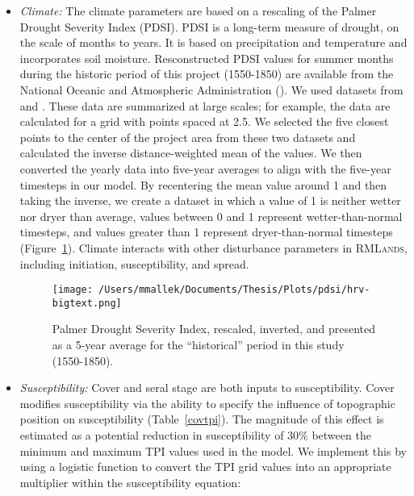 \begin{itemize}
\item \emph{Climate:} The climate parameters are based on a rescaling of the Palmer Drought Severity Index (PDSI). PDSI is a long-term measure of drought, on the scale of months to years. It is based on precipitation and temperature and incorporates soil moisture. Resconstructed PDSI values for summer months during the historic period of this project (1550-1850) are available from the National Oceanic and Atmospheric Administration (). We used datasets from \citet{Zhangetal.2004} and \citet{Cook2004}. These data are summarized at large scales; for example, the \citet{Cook2004} data are calculated for a grid with points spaced at 2.5\textdegree. We selected the five closest points to the center of the project area from these two datasets and calculated the inverse distance-weighted mean of the values. We then converted the yearly data into five-year averages to align with the five-year timesteps in our model. By recentering the mean value around 1 and then taking the inverse, we create a dataset in which a value of 1 is neither wetter nor dryer than average, values between 0 and 1 represent wetter-than-normal timesteps, and values greater than 1 represent dryer-than-normal timesteps (Figure~\ref{pdsi}). Climate interacts with other disturbance parameters in \textsc{RMLands}, including initiation, susceptibility, and spread.

\begin{figure}[htbp]
\centering
\texttt{[image: /Users/mmallek/Documents/Thesis/Plots/pdsi/hrv-bigtext.png]}
\caption{Palmer Drought Severity Index, rescaled, inverted, and presented as a 5-year average for the ``historical'' period in this study (1550-1850).} 
\label{pdsi}
\end{figure}


\item \emph{Susceptibility:} Cover and seral stage are both inputs to susceptibility. Cover modifies susceptibility via the ability to specify the influence of topographic position on susceptibility (Table~\ref{covtpi}). The magnitude of this effect is estimated as a potential reduction in susceptibility of 30\% between the minimum and maximum TPI values used in the model. We implement this by using a logistic function to convert the TPI grid values into an appropriate multiplier within the susceptibility equation:


\end{itemize}
